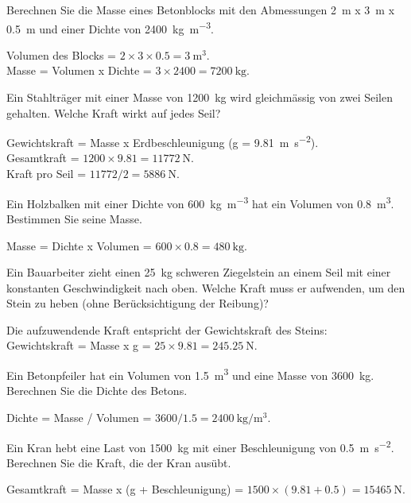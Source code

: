 \begin{questions}

\question Berechnen Sie die Masse eines Betonblocks mit den Abmessungen \SI{2}{\meter} x \SI{3}{\meter} x \SI{0.5}{\meter} und einer Dichte von \SI{2400}{\kilogram\per\cubic\meter}.
\begin{solution}
    Volumen des Blocks = \(2 \times 3 \times 0.5 = \SI{3}{\cubic\meter}\). \\
    Masse = Volumen x Dichte = \(3 \times 2400 = \SI{7200}{\kilogram}\).
\end{solution}

\question Ein Stahlträger mit einer Masse von \SI{1200}{\kilogram} wird gleichmässig von zwei Seilen gehalten. Welche Kraft wirkt auf jedes Seil?
\begin{solution}
    Gewichtskraft = Masse x Erdbeschleunigung (g = \SI{9.81}{\meter\per\square\second}). \\
    Gesamtkraft = \(1200 \times 9.81 = \SI{11772}{\newton}\). \\
    Kraft pro Seil = \(11772 / 2 = \SI{5886}{\newton}\).
\end{solution}

\question Ein Holzbalken mit einer Dichte von \SI{600}{\kilogram\per\cubic\meter} hat ein Volumen von \SI{0.8}{\cubic\meter}. Bestimmen Sie seine Masse.
\begin{solution}
    Masse = Dichte x Volumen = \(600 \times 0.8 = \SI{480}{\kilogram}\).
\end{solution}

\question Ein Bauarbeiter zieht einen \SI{25}{\kilogram} schweren Ziegelstein an einem Seil mit einer konstanten Geschwindigkeit nach oben. Welche Kraft muss er aufwenden, um den Stein zu heben (ohne Berücksichtigung der Reibung)?
\begin{solution}
    Die aufzuwendende Kraft entspricht der Gewichtskraft des Steins: \\
    Gewichtskraft = Masse x g = \(25 \times 9.81 = \SI{245.25}{\newton}\).
\end{solution}

\question Ein Betonpfeiler hat ein Volumen von \SI{1.5}{\cubic\meter} und eine Masse von \SI{3600}{\kilogram}. Berechnen Sie die Dichte des Betons.
\begin{solution}
    Dichte = Masse / Volumen = \(3600 / 1.5 = \SI{2400}{\kilogram\per\cubic\meter}\).
\end{solution}

\question Ein Kran hebt eine Last von \SI{1500}{\kilogram} mit einer Beschleunigung von \SI{0.5}{\meter\per\square\second}. Berechnen Sie die Kraft, die der Kran ausübt.
\begin{solution}
    Gesamtkraft = Masse x (g + Beschleunigung) = \(1500 \times (9.81 + 0.5) = \SI{15465}{\newton}\).
\end{solution}


\end{questions}
